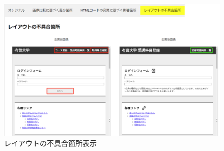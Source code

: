 \begin{figure}[tp]
    \centering
    \includegraphics[width=1.0\textwidth]{image/5/5_app_3.png}
    \caption{レイアウトの不具合箇所表示}
    \label{fig:test1_subeffect}
\end{figure}

